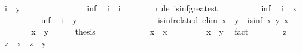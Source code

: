 \begin{isabellebody}
\ {\isachardoublequoteopen}i\ {\isasymsqsubseteq}\ y{\isachardoublequoteclose}\ \isacommand{{\isachardot}{\isachardot}}\isamarkupfalse%
\isanewline
\ \ \ \ \ \ \isamarkupfalse%
\isanewline
\ \ \ \ \ \ \isamarkupfalse%
\ inf\ \isamarkupfalse%
\ {\isachardoublequoteopen}i{\isacharprime}\ {\isasymsqsubseteq}\ i{\isachardoublequoteclose}\isanewline
\ \ \ \ \ \ \isamarkupfalse%
\ {\isacharparenleft}rule\ is{\isacharunderscore}inf{\isacharunderscore}greatest{\isacharparenright}\isanewline
\ \ \ \ \ \ \ \ \isamarkupfalse%
\ inf{\isacharprime}\ \isamarkupfalse%
\ {\isachardoublequoteopen}i{\isacharprime}\ {\isasymsqsubseteq}\ x{\isachardoublequoteclose}\ \isacommand{{\isachardot}{\isachardot}}\isamarkupfalse%
\isanewline
\ \ \ \ \ \ \ \ \isamarkupfalse%
\ inf{\isacharprime}\ \isamarkupfalse%
\ {\isachardoublequoteopen}i{\isacharprime}\ {\isasymsqsubseteq}\ y{\isachardoublequoteclose}\ \isacommand{{\isachardot}{\isachardot}}\isamarkupfalse%
\isanewline
\ \ \ \ \ \ \isamarkupfalse%
\isanewline
\ \ \ \ \isamarkupfalse%
\isanewline
\ \ \isamarkupfalse%
%
\endisatagproof
{\isafoldproof}%
%
\isadelimproof
\isanewline
%
\endisadelimproof
%
\isadeliminvisible
\isanewline
\ \ %
\endisadeliminvisible
%
\isataginvisible
{}\isamarkupfalse%
\ is{\isacharunderscore}inf{\isacharunderscore}related\ {\isacharbrackleft}elim{\isacharquery}{\isacharbrackright}{\isacharcolon}\ {\isachardoublequoteopen}x\ {\isasymsqsubseteq}\ y\ {\isasymLongrightarrow}\ is{\isacharunderscore}inf\ x\ y\ x{\isachardoublequoteclose}\isanewline
\ \ \isamarkupfalse%
\ {\isacharminus}\isanewline
\ \ \ \ \isamarkupfalse%
\ {\isachardoublequoteopen}x\ {\isasymsqsubseteq}\ y{\isachardoublequoteclose}\isanewline
\ \ \ \ \isamarkupfalse%
\ {\isacharquery}thesis\isanewline
\ \ \ \ \isamarkupfalse%
\isanewline
\ \ \ \ \ \ \isamarkupfalse%
\ {\isachardoublequoteopen}x\ {\isasymsqsubseteq}\ x{\isachardoublequoteclose}\ \isacommand{{\isachardot}{\isachardot}}\isamarkupfalse%
\isanewline
\ \ \ \ \ \ \isamarkupfalse%
\ {\isachardoublequoteopen}x\ {\isasymsqsubseteq}\ y{\isachardoublequoteclose}\ \isamarkupfalse%
\ fact\isanewline
\ \ \ \ \ \ \isamarkupfalse%
\ z\ \isamarkupfalse%
\ {\isachardoublequoteopen}z\ {\isasymsqsubseteq}\ x{\isachardoublequoteclose}\ \ {\isachardoublequoteopen}z\ {\isasymsqsubseteq}\ y{\isachardoublequoteclose}\ \isamarkupfalse%

\end{isabellebody}
